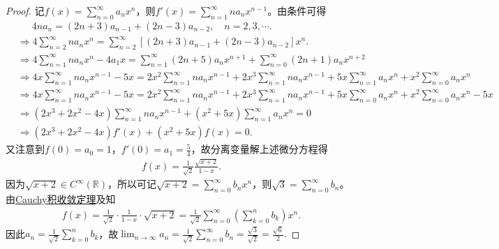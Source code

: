\documentclass[../../main.tex]{subfiles}%
\begin{document}
\begin{proof}

记$f(x) = \sum_{n=0}^{\infty} a_n x^n$，则$f'(x) = \sum_{n=1}^{\infty} n a_n x^{n-1}$。由条件可得
\begin{align*}
&\quad \,\,\, 4n a_n = (2n+3)a_{n-1} + (2n-3)a_{n-2}, \quad n=2,3,\cdots .
\\
&\Rightarrow 4\sum_{n=2}^{\infty} n a_n x^n = \sum_{n=2}^{\infty} \left[ (2n+3)a_{n-1} + (2n-3)a_{n-2} \right] x^n.
\\
&\Rightarrow 4\sum_{n=1}^{\infty} n a_n x^n - 4a_1 x = \sum_{n=1}^{\infty} (2n+5)a_n x^{n+1} + \sum_{n=0}^{\infty} (2n+1)a_n x^{n+2}
\\
&\Rightarrow 4x\sum_{n=1}^{\infty} n a_n x^{n-1} - 5x = 2x^2\sum_{n=1}^{\infty} n a_n x^{n-1} + 2x^3\sum_{n=1}^{\infty} n a_n x^{n-1} + 5x\sum_{n=1}^{\infty} a_n x^n + x^2\sum_{n=0}^{\infty} a_n x^n
\\
&\Rightarrow 4x\sum_{n=1}^{\infty} n a_n x^{n-1} - 5x = 2x^2\sum_{n=1}^{\infty} n a_n x^{n-1} + 2x^3\sum_{n=1}^{\infty} n a_n x^{n-1} + 5x\sum_{n=0}^{\infty} a_n x^n + x^2\sum_{n=0}^{\infty} a_n x^n - 5x
\\
&\Rightarrow (2x^3 + 2x^2 - 4x) \sum_{n=1}^{\infty} n a_n x^{n-1} + (x^2 + 5x) \sum_{n=1}^{\infty} a_n x^n = 0
\\
&\Rightarrow (2x^3 + 2x^2 - 4x) f'(x) + (x^2 + 5x) f(x) = 0.
\end{align*}
又注意到$f(0) = a_0 = 1$，$f'(0) = a_1 = \frac{5}{4}$，故分离变量解上述微分方程得
\begin{align*}
f(x) = \frac{1}{\sqrt{2}} \frac{\sqrt{x+2}}{1-x}.
\end{align*}
因为$\sqrt{x+2} \in C^{\infty}(\mathbb{R})$，所以可记$\sqrt{x+2} = \sum_{n=0}^{\infty} b_n x^n$，则$\sqrt{3} = \sum_{n=0}^{\infty} b_n$。由\hyperref[theorem:Cauchy积收敛定理]{Cauchy积收敛定理}及知
\begin{align*}
f(x) = \frac{1}{\sqrt{2}} \cdot \frac{1}{1-x} \cdot \sqrt{x+2} = \frac{1}{\sqrt{2}} \sum_{n=0}^{\infty} \left( \sum_{k=0}^n b_k \right) x^n.
\end{align*}
因此$a_n = \frac{1}{\sqrt{2}} \sum_{k=0}^n b_k$，故$\lim_{n\rightarrow \infty} a_n = \frac{1}{\sqrt{2}} \sum_{n=0}^{\infty} b_n = \frac{\sqrt{3}}{\sqrt{2}} = \frac{\sqrt{6}}{2}.$

\end{proof}
\end{document}
